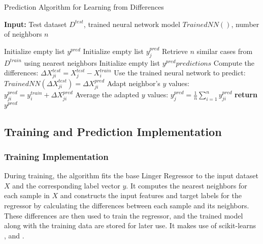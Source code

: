 \documentclass[a4paper, 12pt]{report}
\begin{document}
\begin{algorithm}
    \caption{Prediction Algorithm for Learning from Differences}
	\textbf{Input:} Test dataset $D^{test}$, trained neural network model $Trained NN()$, number of neighbors $n$
    \label{alg:learning_from_differences_predict}
    \begin{algorithmic}
        \State Initialize empty list $y^{pred}$
            \State Initialize empty list $y^{pred}_j$
            \State Retrieve $n$ similar cases from $D^{train}$ using nearest neighbors
			\State Initialize empty list $y^{pred}predictions$
                \State Compute the differences: $\Delta X^{test}_{ji} = X^{test}_j - X^{train}_i$
                \State Use the trained neural network to predict: $Trained NN(\Delta X^{test}_{ji}) = {\Delta X^{pred}_{ji}}$
                \State Adapt neighbor's $y$ values: $y^{pred}_{ji} = y^{train}_i + \Delta X^{pred}_{ji}$
            \EndFor
            \State Average the adapted $y$ values: $y^{pred}_j = \frac{1}{n} \sum_{i=1}^{n} y^{pred}_{ji}$
        \EndFor
		\State \textbf{return} $y^{pred}$
    \end{algorithmic}
\end{algorithm}

\subsection{Training and Prediction Implementation}
\subsubsection{Training Implementation}
During training, the algorithm fits the base Linger Regressor to the input dataset $X$ and the corresponding label vector $y$. 
It computes the nearest neighbors for each sample in $X$ and constructs the input features and target 
labels for the regressor by calculating the differences between each sample and its neighbors. 
These differences are then used to train the regressor, and the trained model along with the 
training data are stored for later use. It makes use of scikit-learns \cite{scikit-learn} ,  and .
\end{document}

